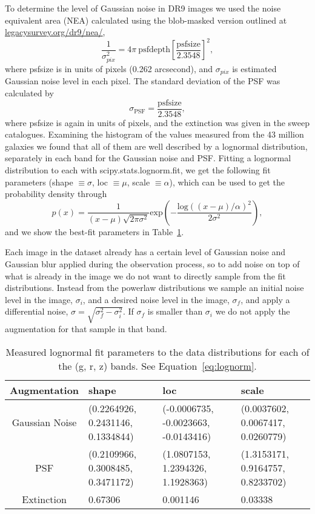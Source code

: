 \documentclass{aastex631}
\begin{document}
To determine the level of Gaussian noise in DR9 images we used the noise equivalent area (NEA) calculated using the blob-masked version outlined at \href{https://www.legacysurvey.org/dr9/nea/}{legacysurvey.org/dr9/nea/},
\begin{equation}
    \frac{1}{\sigma^2_{pix}} = 4\pi\ \mathrm{psfdepth} \left[ \frac{\mathrm{psfsize}}{2.3548}\right]^2,
\end{equation}
where psfsize is in units of pixels (0.262 arcsecond), and $\sigma_{pix}$ is estimated Gaussian noise level in each pixel. The standard deviation of the PSF was calculated by 
\begin{equation}
    \sigma_{\mathrm{PSF}} = \frac{\mathrm{psfsize}}{2.3548},
\end{equation}
where psfsize is again in units of pixels, and the extinction was given in the sweep catalogues. Examining the histogram of the values measured from the 43 million galaxies we found that all of them are well described by a lognormal distribution, separately in each band for the Gaussian noise and PSF. Fitting a lognormal distribution to each with scipy.stats.lognorm.fit, we get the following fit parameters (shape $\equiv \sigma$, loc $\equiv \mu$, scale $\equiv \alpha$), which can be used to get the probability density through
\begin{equation}
    \label{eq:lognorm}
    p(x) = \frac{1}{(x-\mu) \sqrt{2\pi \sigma^2}} \mathrm{exp}\left( -\frac{\mathrm{log}((x-\mu)/\alpha)^2}{2 \sigma^2}\right),
\end{equation}
and we show the best-fit parameters in Table~\ref{tab:augmentations}.

Each image in the dataset already has a certain level of Gaussian noise and Gaussian blur applied during the observation process, so to add noise on top of what is already in the image we do not want to directly sample from the fit distributions. Instead from the powerlaw distributions we sample an initial noise level in the image,  $\sigma_i$, and a desired noise level in the image,  $\sigma_f$, and apply a differential noise, $\sigma = \sqrt{\sigma_f^2 - \sigma_i^2}$. If  $\sigma_f$ is smaller than  $\sigma_i$ we do not apply the augmentation for that sample in that band.

\begin{table}
\centering
\begin{tabular}{c|l|l|l}
\textbf{Augmentation} & \textbf{shape} & \textbf{loc} & \textbf{scale}\\ 
\hline
Gaussian Noise & (0.2264926, 0.2431146, 0.1334844) & (-0.0006735, -0.0023663, -0.0143416) & (0.0037602, 0.0067417, 0.0260779) \\
PSF & (0.2109966, 0.3008485, 0.3471172) & (1.0807153, 1.2394326, 1.1928363) & (1.3153171, 0.9164757, 0.8233702) \\
Extinction & 0.67306 & 0.001146 & 0.03338
\end{tabular}
\caption{Measured lognormal fit parameters to the data distributions for each of the (g, r, z) bands. See Equation~\ref{eq:lognorm}.}
\label{tab:augmentations}
\end{table}



{}

\end{document}
